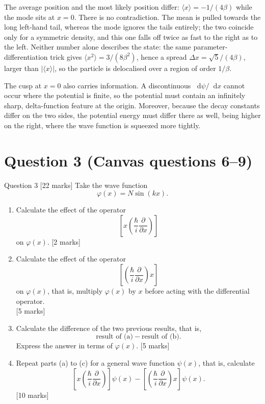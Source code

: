 \documentclass[12pt]{article}
\renewcommand{\d}{\mathop{}\!\mathrm{d}}
\begin{document}
\begin{insightbox}
The average position and the most likely position differ: $\langle x\rangle=-1/(4\beta)$ while the mode sits at $x=0$. There is no contradiction. The mean is pulled towards the long left-hand tail, whereas the mode ignores the tails entirely; the two coincide only for a symmetric density, and this one falls off twice as fast to the right as to the left. Neither number alone describes the state: the same parameter-differentiation trick gives $\langle x^{2}\rangle=3/(8\beta^{2})$, hence a spread $\Delta x=\sqrt{5}/(4\beta)$, larger than $|\langle x\rangle|$, so the particle is delocalised over a region of order $1/\beta$.

The cusp at $x=0$ also carries information. A discontinuous $\d\psi/\d x$ cannot occur where the potential is finite, so the potential must contain an infinitely sharp, delta-function feature at the origin. Moreover, because the decay constants differ on the two sides, the potential energy must differ there as well, being higher on the right, where the wave function is squeezed more tightly.
\end{insightbox}
\fi

\newpage
\section{Question 3 (Canvas questions 6--9)}
\begin{problembox}{Question 3 \hfill [22 marks]}
Take the wave function
\[
    \varphi(x) = N \sin(kx).
\]
\begin{enumerate}
    \item Calculate the effect of the operator
    \[
        \left[x\left(\frac{\hbar}{i}\frac{\partial}{\partial x}\right)\right]
    \]
    on \(\varphi(x)\). \hfill [2 marks]

    \item Calculate the effect of the operator
    \[
        \left[\left(\frac{\hbar}{i}\frac{\partial}{\partial x}\right)x\right]
    \]
    on \(\varphi(x)\), that is, multiply \(\varphi(x)\) by \(x\) before acting with the differential operator.
    \\
    \phantom{add some invisible space} \hfill [5 marks]

    \item Calculate the difference of the two previous results, that is,
    \[
        \text{result of (a)} - \text{result of (b)}.
    \]
    Express the answer in terms of \(\varphi(x)\). \hfill [5 marks]

    \item Repeat parts (a) to (c) for a general wave function \(\psi(x)\), that is, calculate
    \[
        \left[x\left(\frac{\hbar}{i}\frac{\partial}{\partial x}\right)\right] \psi(x)
        -
        \left[\left(\frac{\hbar}{i}\frac{\partial}{\partial x}\right)x\right] \psi(x).
    \]
    \hfill [10 marks]
\end{enumerate}
\end{problembox}
\end{document}
